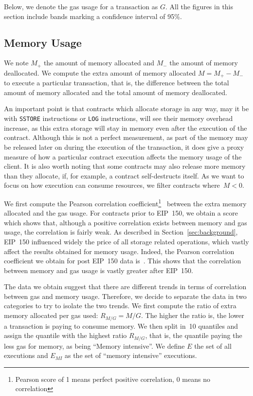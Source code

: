Below, we denote the gas usage for a transaction as $G$. All the figures in this section include bands marking a confidence interval of 95\%.

\subsection{Memory Usage}
 We note $M_{+}$ the amount of memory allocated and $M_{-}$ the amount of memory deallocated. We compute the extra amount of memory allocated $M = M_{+} - M_{-}$ to execute a particular transaction, that is, the difference between the total amount of memory allocated and the total amount of memory deallocated.

An important point is that contracts which allocate storage in any way, may it be with \lstinline{SSTORE} instructions or \lstinline{LOG} instructions, will see their memory overhead increase, as this extra storage will stay in memory even after the execution of the contract. Although this is not a perfect measurement, as part of the memory may be released later on during the execution of the transaction, it does give a proxy measure of how a particular contract execution affects the memory usage of the client. It is also worth noting that some contracts may also release more memory than they allocate, if, for example, a contract self-destructs itself. As we want to focus on how execution can consume resources, we filter contracts where~$M < 0$.

We first compute the Pearson correlation coefficient\footnote{Pearson score of 1 means perfect positive correlation, 0 means no correlation}~\cite{boslaugh2012statistics} between the extra memory allocated and the gas usage. For contracts prior to  EIP~150, we obtain a score  which shows that, although a positive correlation exists between memory and gas usage, the correlation is fairly weak. As described in Section~\ref{sec:background}, EIP~150 influenced widely the price of all storage related operations, which vastly affect the results obtained for memory usage. Indeed, the Pearson correlation coefficient we obtain for post EIP~150 data is~. This shows that the correlation between memory and gas usage is vastly greater after EIP~150.

The data we obtain suggest that there are different trends in terms of correlation between gas and memory usage. Therefore, we decide to separate the data in two categories to try to isolate the two trends. We first compute the ratio of extra memory allocated per gas used: $R_{M/G} = M / G$. The higher the ratio is, the lower a transaction is paying to consume memory. We then split in~10 quantiles and assign the quantile with the highest ratio $R_{M/G}$, that is, the quantile paying the less gas for memory, as being ``Memory intensive''. We define $E$ the set of all executions and $E_{MI}$ as the set of ``memory intensive'' executions.

